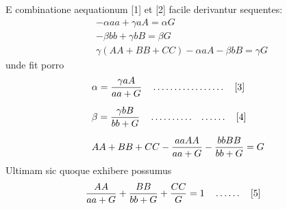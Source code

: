 E combinatione aequationum [1] et [2] facile derivantur sequentes:
\[
\begin{aligned}
&-\alpha aa+\gamma aA=\alpha G\\[6pt]
&-\beta bb+\gamma bB=\beta G\\[6pt]
&\gamma(AA+BB+CC)-\alpha aA-\beta bB=\gamma G
\end{aligned}
\]
unde fit porro
\[
\begin{aligned}
&\alpha=\frac{\gamma aA}{aa+G}\quad\mathinner{.\,.\,.\,.\,.\,.\,.\,.\,.\,.\,.\,.\,.\,.\,.\,.\,.}\quad\text{[3]}\\[6pt]
&\beta=\frac{\gamma bB}{bb+G}\quad\mathinner{.\,.\,.\,.\,.\,.\,.\,.\,.\,.\quad.\,.\,.\,.\,.\,.}\quad\text{[4]}\\[6pt]
&AA+BB+CC-\frac{aaAA}{aa+G}-\frac{bbBB}{bb+G}=G
\end{aligned}
\]
Ultimam sic quoque exhibere possumus
\[
\begin{aligned}
&\frac{AA}{aa+G}+\frac{BB}{bb+G}+\frac{CC}{G}=1\quad\mathinner{.\,.\,.\,.\,.\,.}\quad\text{[5]}
\end{aligned}
\]


